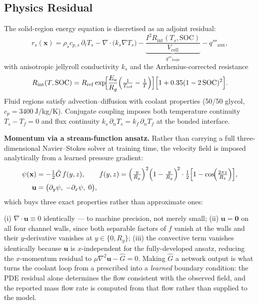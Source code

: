 \documentclass[journal,10pt,compsoc,onecolumn]{IEEEtran}
\begin{document}
\subsection{Physics Residual}
\label{sec:details-physics}

\noindent
The solid-region energy equation is discretised as an adjoint residual:
\begin{equation}
 r_s(\mathbf{x}) = \rho_s c_{p,s}\,\partial_t T_s
   - \nabla\cdot\bigl(k_s\nabla T_s\bigr)
   - \underbrace{\frac{I^2 R_{\mathrm{int}}(T_s,\mathrm{SOC})}{V_{\mathrm{cell}}}}_{q'''_{\mathrm{Joule}}}
   - q'''_{\mathrm{aux}},
\label{eq:pde}
\end{equation}
with anisotropic jellyroll conductivity $k_s$ and the Arrhenius-corrected
resistance~\cite{raissi2019}
\begin{equation}
 R_{\mathrm{int}}(T,\mathrm{SOC}) = R_{\mathrm{ref}}
   \exp\!\Bigl[\frac{E_a}{R_g}\Bigl(\tfrac1{T_{\mathrm{ref}}}-\tfrac1T\Bigr)\Bigr]
   \Bigl[1+0.35(1-2\,\mathrm{SOC})^2\Bigr].
\label{eq:arrhenius}
\end{equation}
Fluid regions satisfy advection--diffusion with coolant properties
(50/50 glycol, $c_p=\SI{3400}{\joule\per\kilo\gram\per\kelvin}$). Conjugate
coupling imposes both temperature continuity
$T_s-T_f=0$ and flux continuity
$k_s\,\partial_n T_s = k_f\,\partial_n T_f$ at the bonded interface.

\noindent
\textbf{Momentum via a stream-function ansatz.} Rather than carrying a full
three-dimensional Navier--Stokes solver at training time, the velocity field is
imposed analytically from a learned pressure gradient:
\begin{align}
 \psi(\mathbf{x}) &= -\tfrac12\hat{G}\,f(y,z), \qquad
 f(y,z) = \Bigl(\tfrac{y}{R_y}\Bigr)^2\Bigl(1-\tfrac{y}{R_y}\Bigr)^{\!2}
                 \cdot\tfrac12\Bigl[1-\cos\!\Bigl(\tfrac{2\pi z}{R_z}\Bigr)\Bigr],\\
 \mathbf{u} &= \bigl(\partial_y\psi,\;-\partial_x\psi,\;0\bigr),
\label{eq:stream}
\end{align}
which buys three exact properties rather than approximate ones:
\begin{intextpara}
(i) $\nabla\cdot\mathbf{u}\equiv0$ identically --- to machine precision, not
merely small; (ii) $\mathbf{u}=\mathbf{0}$ on all four channel walls, since both
separable factors of $f$ vanish at the walls and their $y$-derivative vanishes at
$y\in\{0,R_y\}$; (iii) the convective term vanishes identically because
$\mathbf{u}$ is $x$-independent for the fully-developed ansatz, reducing the
$x$-momentum residual to $\mu\nabla^2\mathbf{u}-\hat{G}=0$. Making $\hat{G}$ a
network output is what turns the coolant loop from a prescribed into a
\emph{learned} boundary condition: the PDE residual alone determines the flow
consistent with the observed field, and the reported mass flow rate is computed
from that flow rather than supplied to the model.
\end{intextpara}
\end{document}
